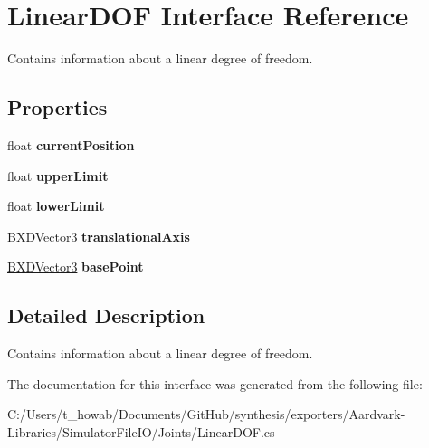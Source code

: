 \hypertarget{interface_linear_d_o_f}{}\section{Linear\+D\+OF Interface Reference}
\label{interface_linear_d_o_f}


Contains information about a linear degree of freedom.  


\subsection*{Properties}
\begin{DoxyCompactItemize}
\item 
\mbox{\label{interface_linear_d_o_f_a2896b47985197900ddd4fbbbfa9a680f}} 
float {\bfseries current\+Position}
\item 
\mbox{\label{interface_linear_d_o_f_a1258bf73e07e828b2eb04fcd2f79a938}} 
float {\bfseries upper\+Limit}
\item 
\mbox{\label{interface_linear_d_o_f_a90467c4d698f19817e8a16c759c891a8}} 
float {\bfseries lower\+Limit}
\item 
\mbox{\label{interface_linear_d_o_f_ae0b909200b01a51c5fe7a764f1152a8b}} 
\hyperlink{class_b_x_d_vector3}{B\+X\+D\+Vector3} {\bfseries translational\+Axis}
\item 
\mbox{\label{interface_linear_d_o_f_aeebfc4bd8f1197e8337c60957042e0ed}} 
\hyperlink{class_b_x_d_vector3}{B\+X\+D\+Vector3} {\bfseries base\+Point}
\end{DoxyCompactItemize}


\subsection{Detailed Description}
Contains information about a linear degree of freedom. 



The documentation for this interface was generated from the following file\+:\begin{DoxyCompactItemize}
\item 
C\+:/\+Users/t\+\_\+howab/\+Documents/\+Git\+Hub/synthesis/exporters/\+Aardvark-\/\+Libraries/\+Simulator\+File\+I\+O/\+Joints/Linear\+D\+O\+F.\+cs\end{DoxyCompactItemize}
